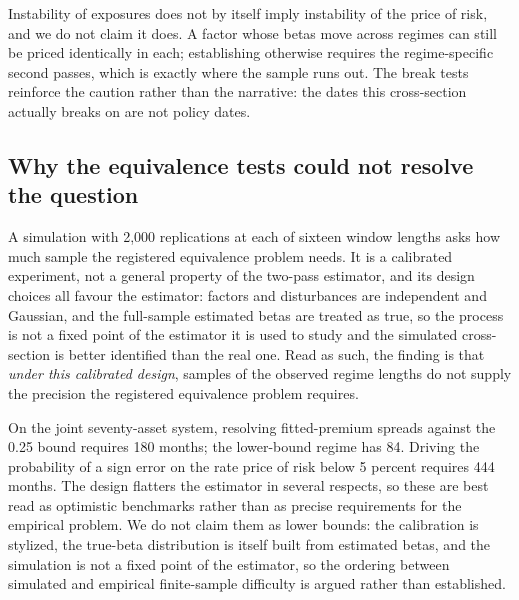 \documentclass[11pt]{article}
\begin{document}
Instability of exposures does not by itself imply instability of the price of
risk, and we do not claim it does. A factor whose betas move across regimes can
still be priced identically in each; establishing otherwise requires the
regime-specific second passes, which is exactly where the sample runs out. The
break tests reinforce the caution rather than the narrative: the dates this
cross-section actually breaks on are not policy dates.

\subsection{Why the equivalence tests could not resolve the question}
\label{sec:power}

A simulation with 2,000 replications at each of sixteen window lengths asks how %
much sample the registered equivalence problem needs. It is a calibrated
experiment, not a general property of the two-pass estimator, and its design
choices all favour the estimator: factors and disturbances are independent and
Gaussian, and the full-sample estimated betas are treated as true, so the process
is not a fixed point of the estimator it is used to study and the simulated
cross-section is better identified than the real one. Read as such, the finding
is that \emph{under this calibrated design}, samples of the observed regime
lengths do not supply the precision the registered equivalence problem requires.

On the joint seventy-asset system, resolving
fitted-premium spreads against the 0.25 bound requires 180 months; the %
lower-bound regime has 84. Driving the probability of a sign error on the rate %
price of risk below 5 percent requires 444 months. %
The design flatters the estimator in several respects, so these are best read as
optimistic benchmarks rather than as precise requirements for the empirical
problem. We do not claim them as lower bounds: the calibration is stylized, the
true-beta distribution is itself built from estimated betas, and the simulation
is not a fixed point of the estimator, so the ordering between simulated and
empirical finite-sample difficulty is argued rather than established.
\end{document}
